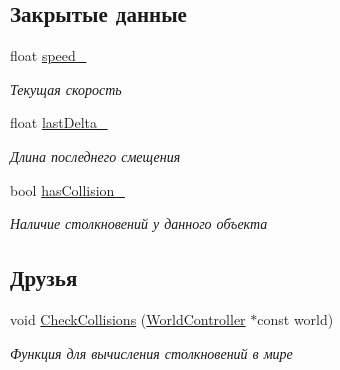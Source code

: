 \subsection*{Закрытые данные}
\begin{DoxyCompactItemize}
\item 
\mbox{\label{classrtm_1_1_dynamic_object_a3bb8542efacb7c256d6a60fb5e022916}} 
float \hyperlink{classrtm_1_1_dynamic_object_a3bb8542efacb7c256d6a60fb5e022916}{speed\+\_\+}
\begin{DoxyCompactList}\small\item\em Текущая скорость \end{DoxyCompactList}\item 
\mbox{\label{classrtm_1_1_dynamic_object_af325931cad8f3256cbda0c08f22cc004}} 
float \hyperlink{classrtm_1_1_dynamic_object_af325931cad8f3256cbda0c08f22cc004}{last\+Delta\+\_\+}
\begin{DoxyCompactList}\small\item\em Длина последнего смещения \end{DoxyCompactList}\item 
\mbox{\label{classrtm_1_1_dynamic_object_a05fe95cdc787c012fe36584398e82428}} 
bool \hyperlink{classrtm_1_1_dynamic_object_a05fe95cdc787c012fe36584398e82428}{has\+Collision\+\_\+}
\begin{DoxyCompactList}\small\item\em Наличие столкновений у данного объекта \end{DoxyCompactList}\end{DoxyCompactItemize}
\subsection*{Друзья}
\begin{DoxyCompactItemize}
\item 
void \hyperlink{classrtm_1_1_dynamic_object_af73a5c4922e4f77fba3e44898bfa308b}{Check\+Collisions} (\hyperlink{classrtm_1_1_world_controller}{World\+Controller} $\ast$const world)
\begin{DoxyCompactList}\small\item\em Функция для вычисления столкновений в мире \end{DoxyCompactList}\end{DoxyCompactItemize}


